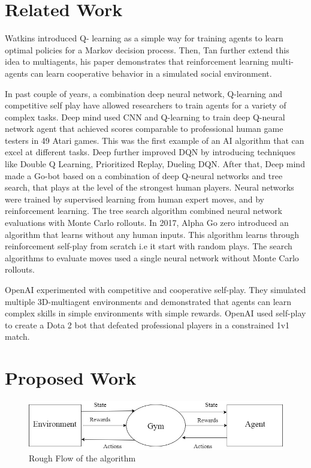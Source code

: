 \documentclass[conference]{IEEEtran}
\begin{document}
\section{Related Work}
Watkins\cite{sp1} introduced Q- learning as a simple way for training agents to learn
optimal policies for a Markov decision process. Then, Tan\cite{sp2} further extend
this idea to multiagents, his paper demonstrates that reinforcement learning
multi-agents can learn cooperative behavior in a simulated social environment.

In past couple of years, a combination deep neural network, Q-learning and
competitive self play have allowed researchers to train agents for a variety
of complex tasks. Deep mind\cite{sp3} used CNN and Q-learning to train deep Q-neural
network agent that achieved scores comparable to professional human game
testers in 49 Atari games. This was the first example of an AI algorithm
that can excel at different tasks. Deep further improved DQN by introducing
techniques like Double Q Learning\cite{sp4}, Prioritized Replay\cite{sp5}, Dueling DQN\cite{sp6}.  After
that, Deep mind made a Go-bot\cite{sp7} based on a combination of deep Q-neural
networks and tree search, that plays at the level of the strongest human
players. Neural networks were trained by supervised learning from human
expert moves, and by reinforcement learning. The tree search algorithm
combined neural network evaluations with Monte Carlo rollouts. In 2017, Alpha
Go zero\cite{sp8} introduced an algorithm that learns without any human inputs.
This algorithm learns through reinforcement self-play from scratch i.e it start
 with random plays. The search algorithms to evaluate moves used a single
 neural network without Monte Carlo rollouts.

OpenAI experimented with competitive and cooperative self-play\cite{sp9}. They simulated
multiple 3D-multiagent environments and demonstrated that agents can learn
complex skills in simple environments with simple rewards. OpenAI\cite{sp10} used
self-play to create a Dota 2 bot that defeated professional players in a
constrained 1v1 match.

\section{Proposed Work}
\begin{figure}[h]

	\includegraphics[width=\linewidth]{flow.jpg}
	\caption{Rough Flow of the algorithm}

\end{figure}
\end{document}
